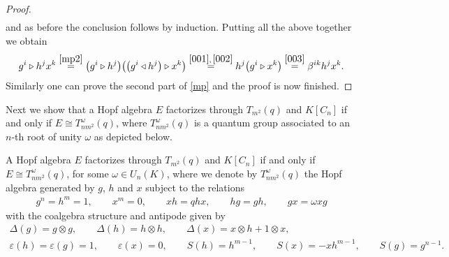 \begin{proof}
\begin{gather*}
\end{gather*}
and as before the conclusion follows by induction. Putting all the above together we obtain
\begin{gather*}
g^{i} \triangleright h^{j} x^{k} \stackrel{\eqref{mp2}} {=} \big(g^{i} \triangleright h^{j}\big)\big( \big(g^{i} \triangleleft h^{j}\big)\triangleright x^{k}\big) \stackrel{\eqref{001}, \, \eqref{002}} {=} h^{j} \big(g^{i} \triangleright x^{k}\big)\stackrel{\eqref{003}} {=} \beta^{ik} h^{j} x^{k}.
\end{gather*}
Similarly one can prove the second part of \eqref{mp} and the proof is now finished.
\end{proof}

Next we show that a Hopf algebra $E$ factorizes through $T_{m^{2}}(q)$ and $K[C_n]$ if and only if $E \cong T_{nm^{2}}^{\omega}(q)$, where $T_{nm^{2}}^ {\omega}(q)$ is a quantum group associated to an $n$-th root of unity $\omega$ as depicted below.

\begin{Corollary}\label{primaclasi}
A Hopf algebra $E$ factorizes through $T_{m^{2}}(q)$ and $K[C_n]$ if and only if $E \cong T_{nm^{2}}^ {\omega}(q)$, for some $\omega \in U_n (K)$, where we denote by $T_{nm^{2}}^{\omega}(q)$ the Hopf algebra generated by $g$, $h$ and $x$ subject to the relations
\begin{gather*}
g^{n} = h^{m} = 1,\qquad x^{m} = 0,\qquad x h = q h x, \qquad h g = g h,\qquad g x = \omega x g
\end{gather*}
with the coalgebra structure and antipode given by
\begin{gather*}
\Delta(g) = g \otimes g, \qquad \Delta(h) = h \otimes h, \qquad \Delta(x) = x \otimes h + 1 \otimes x,\\
\varepsilon(h) = \varepsilon(g) = 1, \qquad \varepsilon(x) = 0, \qquad S(h) = h^{m-1}, \qquad S(x) = -xh^{m-1}, \qquad S(g) = g^{n-1}.
\end{gather*}
\end{Corollary}

